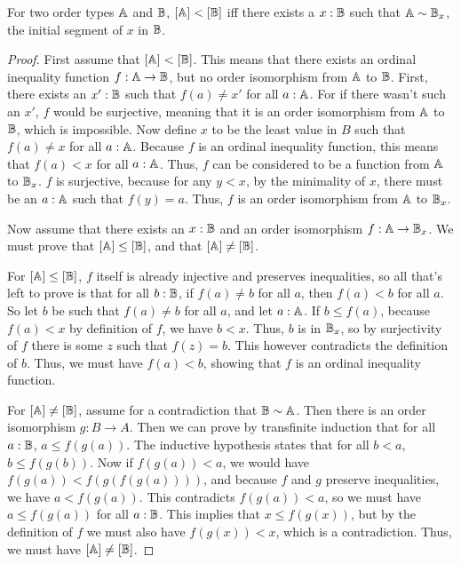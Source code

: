 \documentclass[../../math.tex]{subfiles}
\begin{document}
\begin{theorem} \label{ord_lt_simpl}
    For two order types $\mathbb{A}$ and $\mathbb{B}$, $[\mathbb{A}] < [\mathbb{B}]$ iff there exists a $x : \mathbb{B}$
    such that $\mathbb{A} \sim \mathbb{B}_x$, the initial segment of $x$ in $\mathbb{B}$.
\end{theorem}
\begin{proof}
    First assume that $[\mathbb{A}] < [\mathbb{B}]$.  This means that there exists an ordinal
    inequality function $f : \mathbb{A} \to \mathbb{B}$, but no order isomorphism from $\mathbb{A}$ to
    $\mathbb{B}$.  First, there exists an $x' : \mathbb{B}$ such that $f(a) \neq x'$ for all $a
    : \mathbb{A}$.  For if there wasn't such an $x'$, $f$ would be surjective, meaning
    that it is an order isomorphism from $\mathbb{A}$ to $\mathbb{B}$, which is impossible.  Now
    define $x$ to be the least value in $B$ such that $f(a) \neq x$ for all $a :
    \mathbb{A}$.  Because $f$ is an ordinal inequality function, this means that $f(a) <
    x$ for all $a : \mathbb{A}$.  Thus, $f$ can be considered to be a function from $\mathbb{A}$
    to $\mathbb{B}_x$.  $f$ is surjective, because for any $y < x$, by the minimality of
    $x$, there must be an $a : \mathbb{A}$ such that $f(y) = a$.  Thus, $f$ is an order
    isomorphism from $\mathbb{A}$ to $\mathbb{B}_x$.

    Now assume that there exists an $x : \mathbb{B}$ and an order isomorphism $f : \mathbb{A}
    \to \mathbb{B}_x$.  We must prove that $[\mathbb{A}] \leq [\mathbb{B}]$, and that $[\mathbb{A}] \neq [\mathbb{B}]$.

    For $[\mathbb{A}] \leq [\mathbb{B}]$, $f$ itself is already injective and preserves
    inequalities, so all that's left to prove is that for all $b : \mathbb{B}$, if $f(a)
    \neq b$ for all $a$, then $f(a) < b$ for all $a$.  So let $b$ be such that
    $f(a) \neq b$ for all $a$, and let $a : \mathbb{A}$.  If $b \leq f(a)$, because
    $f(a) < x$ by definition of $f$, we have $b < x$.  Thus, $b$ is in $\mathbb{B}_x$,
    so by surjectivity of $f$ there is some $z$ such that $f(z) = b$.  This
    however contradicts the definition of $b$.  Thus, we must have $f(a) < b$,
    showing that $f$ is an ordinal inequality function.

    For $[\mathbb{A}] \neq [\mathbb{B}]$, assume for a contradiction that $\mathbb{B} \sim \mathbb{A}$.  Then
    there is an order isomorphism $g : B \to A$.  Then we can prove by
    transfinite induction that for all $a : \mathbb{B}$, $a \leq f(g(a))$.  The
    inductive hypothesis states that for all $b < a$, $b \leq f(g(b))$.  Now if
    $f(g(a)) < a$, we would have $f(g(a)) < f(g(f(g(a))))$, and because $f$ and
    $g$ preserve inequalities, we have $a < f(g(a))$.  This contradicts $f(g(a))
    < a$, so we must have $a \leq f(g(a))$ for all $a : \mathbb{B}$.  This implies that
    $x \leq f(g(x))$, but by the definition of $f$ we must also have $f(g(x)) <
    x$, which is a contradiction.  Thus, we must have $[\mathbb{A}] \neq [\mathbb{B}]$.
\end{proof}
\end{document}
